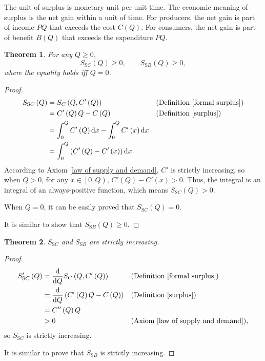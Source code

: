 \documentclass{article}
\newtheorem{theorem}{Theorem}[subsection]
\begin{document}
The unit of surplus is monetary unit per unit time.
The economic meaning of surplus is the net gain within a unit of time.
For producers, the net gain is part of income $PQ$ that exceeds the cost $C\left(Q\right)$.
For consumers, the net gain is part of benefit $B\left(Q\right)$ that exceeds the expenditure $PQ$.

\begin{theorem}
For any $Q\ge0$,
$$S_{\mathrm SC}\left(Q\right)\ge0,
\qquad S_{\mathrm SB}\left(Q\right)\ge0,$$
where the equality holds iff $Q=0$.
\end{theorem}
\begin{proof}
\begin{align*}
S_{\mathrm SC}\left(Q\right)&=S_C\left(Q,C'\left(Q\right)\right)&&\text{(Definition \ref{formal surplus})}\\
&=C'\left(Q\right)Q-C\left(Q\right)&&\text{(Definition \ref{surplus})}\\
&=\int_0^QC'\left(Q\right)\mathrm dx-\int_0^QC'\left(x\right)\mathrm dx\\
&=\int_0^Q\left(C'\left(Q\right)-C'\left(x\right)\right)\mathrm dx.
\end{align*}
According to Axiom \ref{law of supply and demand}, $C'$ is strictly increasing,
so when $Q>0$, for any $x\in\left[0,Q\right)$, $C'\left(Q\right)-C'\left(x\right)>0$.
Thus, the integral is an integral of an always-positive function, which means $S_{\mathrm SC}\left(Q\right)>0$.

When $Q=0$, it can be easily proved that $S_{\mathrm SC}\left(Q\right)=0$.

It is similar to show that $S_{\mathrm SB}\left(Q\right)\ge0$.
\end{proof}

\begin{theorem}
$S_{\mathrm SC}$ and $S_{\mathrm SB}$ are strictly increasing.
\end{theorem}
\begin{proof}
\begin{align*}
S_{\mathrm SC}'\left(Q\right)&=\frac{\mathrm d}{\mathrm dQ}S_C\left(Q,C'\left(Q\right)\right)&&\text{(Definition \ref{formal surplus})}\\
&=\frac{\mathrm d}{\mathrm dQ}\left(C'\left(Q\right)Q-C\left(Q\right)\right)&&\text{(Definition \ref{surplus})}\\
&=C''\left(Q\right)Q\\
&>0&&\text{(Axiom \ref{law of supply and demand})},
\end{align*}
so $S_{\mathrm SC}$ is strictly increasing.

It is similar to prove that $S_{\mathrm SB}$ is strictly increasing.
\end{proof}
\end{document}
